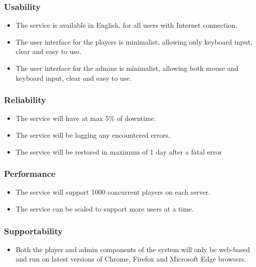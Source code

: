 \documentclass{article}
\begin{document}
\subsubsection{Usability}

\begin{itemize}
	\item The service is available in English, for all users with Internet connection.
	\item The user interface for the players is minimalist, allowing only keyboard input, clear and easy to use.
	\item The user interface for the admins is minimalist, allowing both mouse and keyboard input, clear and easy to use.
\end{itemize}

\subsubsection{Reliability}

\begin{itemize}
	\item The service will have at max 5\% of downtime.
	\item The service will be logging any encountered errors.
	\item The service will be restored in maximum of 1 day after a fatal error
\end{itemize}

\subsubsection{Performance}

\begin{itemize}
	\item The service will support 1000 concurrent players on each server.
	\item The service can be scaled to support more users at a time.
\end{itemize}

\subsubsection{Supportability}

\begin{itemize}
	\item Both the player and admin components of the system will only be web-based and run on latest versions of Chrome, Firefox and Microsoft Edge browsers.
\end{itemize}
\end{document}
